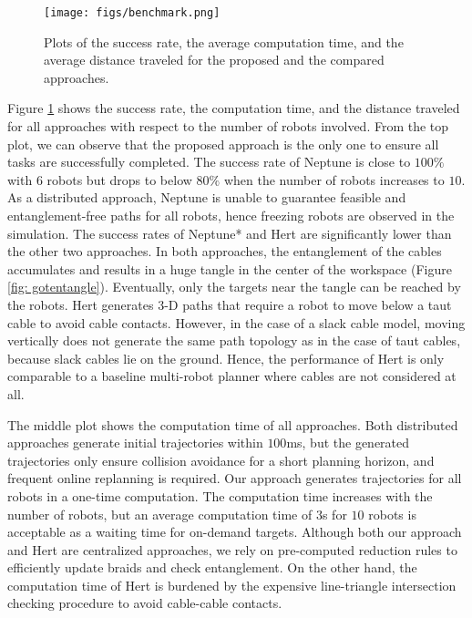 \documentclass[conference]{IEEEtran}
\begin{document}
\begin{figure}[!t]
\centering
\texttt{[image: figs/benchmark.png]}
\caption{\footnotesize  Plots of the success rate, the average computation time, and the average distance traveled for the proposed and the compared approaches.}
\label{fig: benchmark}
\end{figure}

Figure \ref{fig: benchmark} shows the success rate, the computation time, and the distance traveled for all approaches with respect to the number of robots involved.
From the top plot, we can observe that the proposed approach is the only one to ensure all tasks are successfully completed.
The success rate of Neptune is close to $100\%$ with $6$ robots but drops to below $80\%$ when the number of robots increases to $10$.
As a distributed approach, Neptune is unable to guarantee feasible and entanglement-free paths for all robots, hence freezing robots are observed in the simulation.
The success rates of Neptune* and Hert are significantly lower than the other two approaches.
In both approaches, the entanglement of the cables accumulates and results in a huge tangle in the center of the workspace (Figure \ref{fig: gotentangle}).
Eventually, only the targets near the tangle can be reached by the robots.
Hert generates 3-D paths that require a robot to move below a taut cable to avoid cable contacts.
However, in the case of a slack cable model, 
moving vertically does not generate the same path topology as in the case of taut cables, because slack cables lie on the ground.
Hence, the performance of Hert is only comparable to a baseline multi-robot planner where cables are not considered at all.

The middle plot shows the computation time of all approaches. 
Both distributed approaches generate initial trajectories within $100$ms, but the generated trajectories only ensure collision avoidance for a short planning horizon, and frequent online replanning is required.
Our approach generates trajectories for all robots in a one-time computation.
The computation time increases with the number of robots, but an average computation time of $3$s for $10$ robots is acceptable as a waiting time for on-demand targets.
Although both our approach and Hert are centralized approaches, we rely on pre-computed reduction rules to efficiently update braids and check entanglement.
On the other hand, the computation time of Hert is burdened by the expensive line-triangle intersection checking procedure to avoid cable-cable contacts.
\end{document}
